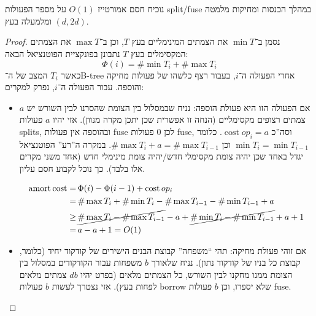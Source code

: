 \documentclass[]{article}
\theoremstyle{definition}
\DeclareMathOperator\amort   {amort}
\DeclareMathOperator\cost    {cost}
\begin{document}
    \section{}
    נוכיח חסם אמורטייז $O(1)$ על מספר הפעולות split/fuse במהלך הכנסות ומחיקות מלמטה ומלמעלה בעץ $(d, 2d)$. \begin{proof}
        נסמן ב־$\min T$ את הצמתים המינימליים בעץ $T$, וכן ב־$\max T$ את הצמתים המקסימלים בעץ $T$
        נתבונן בפונקציית הפוטנציאל הבאה: 
        \[ \Phi(i) = \#\min T_i + \#\max T_i \]
        כאשר $T_i$ המצב של ה־B-tree אחרי הפעולה ה־$i$, בעבור רצף כלשהו של פעולות מחיקה והוספה. 
        עבור הפעולה ה־$i$, נפרק למקרים: 
        \begin{itemize}
            \item אם הפעולה הזו היא פעולת הוספה: 
            נניח שבמסלול בין הצומת שהסרנו לבין השורש יש $a$ צמתים רצופים מקסימליים (הנחה זו אפשרית שכן יתכן מקרה מנוון). אזי יהיו $a$ פעולות splits, ובהוספה אין פעולות fuse לכן 0 פעולות fuse, וסה''כ $\cost op_i = a$. כלומר $\min T_i = \min T_{i - 1}$ וכן $\#\max T_i + a = \#\max T_{i - 1}$. 
            במקרה ה''רע'' הפוטנציאל יגדל באחד שכן יהיה צומת מקסימלי חדש/יהיה צומת מינימלי חדש (אחד משני מקרים אלו בלבד). כך נוכל לקבוע חסם עליון. 
            
            \begin{align*}
                \amort \cost =\, &\Phi(i) - \Phi(i - 1) + \cost op_i \\
                =\, &\#\max T_i + \#\min T_i - \#\max T_{i - 1} - \#\min T_{i - 1} + a \\
                \ge\, &\cancel{\#\max T_{i} - \#\max T_{i - 1}} - a + \cancel{\# \min T_{i} - \#\min T_{i - 1}} + a + 1 \\
                =\, &a - a + 1 = O(1)
            \end{align*}
            
            \item אם זוהי פעולת מחיקה: תהי ``משפחה'' קבוצת הבנים הישירים של קודקוד יחיד (כלומר, קבוצת כל בניו של קודקוד נתון). נניח שלאורך $b$ משפחות עבור הקודקודים במסלול בין הצומת ממנו מחקנו לבין השורש, כל הצמתים מלאים (בפרט יהיו $db$ צמתים מלאים לפחות בעץ). אזי נצטרך לעשות $b$ פעולות borrow שלא יספרו, וכן $b$ פעולות fuse. 
            

\end{itemize}
\end{proof}
\end{document}

